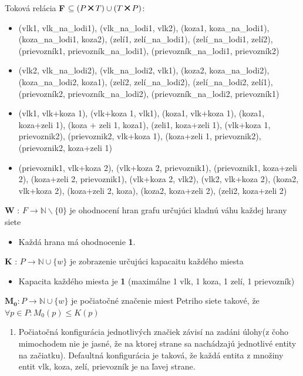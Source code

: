 \documentclass[11pt,a4paper]{article}
\begin{document}
Toková relácia  \textbf{F} $ \subseteq (P \Cross T) \cup (T \Cross P) $:
\begin{itemize}
    \item (vlk1, vlk\_na\_lodi1), (vlk\_na\_lodi1, vlk2), (koza1, koza\_na\_lodi1), (koza\_na\_lodi1, koza2), (zelí1, zelí\_na\_lodi1), (zelí\_na\_lodi1, zelí2), (prievozník1, prievozník\_na\_lodi1), (prievozník\_na\_lodi1, prievozník2)
    \item (vlk2, vlk\_na\_lodi2), (vlk\_na\_lodi2, vlk1), (koza2, koza\_na\_lodi2), (koza\_na\_lodi2, koza1), (zelí2, zelí\_na\_lodi2), (zelí\_na\_lodi2, zelí1), (prievozník2, prievozník\_na\_lodi2), (prievozník\_na\_lodi2, prievozník1)
    \item (vlk1, vlk+koza 1), (vlk+koza 1, vlk1), (koza1, vlk+koza 1), (koza1, koza+zeli 1), (koza + zeli 1, koza1), (zeli1, koza+zeli 1), (vlk+koza 1, prievoznik2), (prievoznik2, vlk+koza 1), (koza+zeli 1, prievoznik2), (prievoznik2, koza+zeli 1)
    \item (prievoznik1, vlk+koza 2), (vlk+koza 2, prievoznik1), (prievoznik1, koza+zeli 2), (koza+zeli 2, prievoznik1), (vlk+koza 2, vlk2), (vlk2, vlk+koza 2), (koza2, vlk+koza 2), (koza+zeli 2, koza), (koza2, koza+zeli 2), (zeli2, koza+zeli 2)
\end{itemize}

\textbf{W} : $ F \rightarrow \mathbb N  \backslash \{0\}$ je ohodnocení hran grafu určujúci kladnú váhu každej hrany siete
\begin{itemize}
    \item Každá hrana má ohodnocenie \textbf{1}.
\end{itemize}

\textbf{K} : $ P \rightarrow \mathbb N \cup \{w\} $ je zobrazenie určujúci kapacaitu každého miesta
\begin{itemize}
    \item Kapacita každého miesta je \textbf{1} (maximálne 1 vlk, 1 koza, 1 zelí, 1 prievozník)
\end{itemize}

$\mathbf{M_0} : P \rightarrow \mathbb N \cup \{w\} $ je počiatočné značenie miest Petriho siete takové, že $ \forall p \in P: M_0(p) \leq K(p) $
 
\begin{enumerate}
    \item Počiatočná konfigurácia jednotlivých značiek závisí na zadáni úlohy(z čoho mimochodem nie je jasné, že na ktorej strane sa nachádzajú jednotlivé entity na začiatku). Defaultná konfigurácia je taková, že každá entita z množiny entit {vlk, koza, zelí, prievozník} je na ľavej strane.
\end{enumerate}
\end{document}
